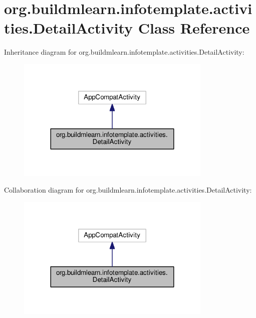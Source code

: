\hypertarget{classorg_1_1buildmlearn_1_1infotemplate_1_1activities_1_1DetailActivity}{}\section{org.\+buildmlearn.\+infotemplate.\+activities.\+Detail\+Activity Class Reference}
\label{classorg_1_1buildmlearn_1_1infotemplate_1_1activities_1_1DetailActivity}


Inheritance diagram for org.\+buildmlearn.\+infotemplate.\+activities.\+Detail\+Activity\+:
\nopagebreak
\begin{figure}[H]
\begin{center}
\leavevmode
\includegraphics[width=264pt]{classorg_1_1buildmlearn_1_1infotemplate_1_1activities_1_1DetailActivity__inherit__graph}
\end{center}
\end{figure}


Collaboration diagram for org.\+buildmlearn.\+infotemplate.\+activities.\+Detail\+Activity\+:
\nopagebreak
\begin{figure}[H]
\begin{center}
\leavevmode
\includegraphics[width=264pt]{classorg_1_1buildmlearn_1_1infotemplate_1_1activities_1_1DetailActivity__coll__graph}
\end{center}
\end{figure}
